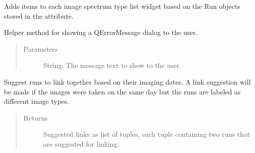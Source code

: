 \documentclass[letterpaper,10pt,english]{sphinxmanual}
\begin{document}
\begin{fulllineitems}

\begin{fulllineitems}
\label{\detokenize{polo.windows:polo.windows.spectrum_dialog.SpectrumDialog.populate_list_widgets}}
Adds items to each image spectrum type list widget based on the
Run objects stored in the  attribute.

\end{fulllineitems}


\begin{fulllineitems}
\label{\detokenize{polo.windows:polo.windows.spectrum_dialog.SpectrumDialog.show_error_message}}
Helper method for showing a QErrorMessage dialog to the user.
\begin{quote}\begin{description}
\item[{Parameters}] \leavevmode
{} \textendash{} String. The message text to show to the user.

\end{description}\end{quote}

\end{fulllineitems}


\begin{fulllineitems}
\label{\detokenize{polo.windows:polo.windows.spectrum_dialog.SpectrumDialog.suggest_links}}
Suggest runs to link together based on their imaging dates. A link
suggestion will be made if the images were taken on the same day but the
runs are labeled as different image types.
\begin{quote}\begin{description}
\item[{Returns}] \leavevmode
Suggested links as list of tuples, each tuple containing two
runs that are suggested for linking.


\end{description}
\end{quote}
\end{fulllineitems}
\end{fulllineitems}
\end{document}
